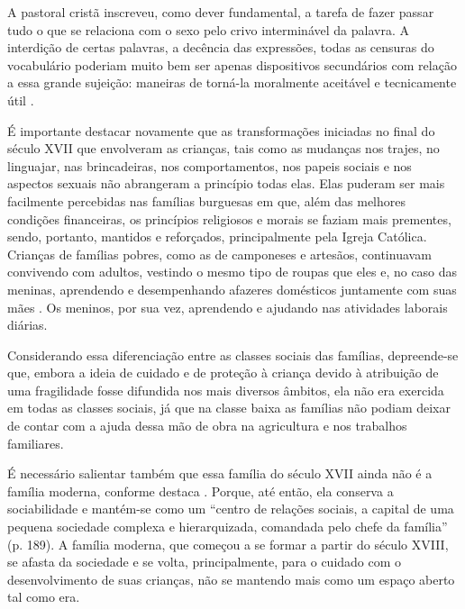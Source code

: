 \begin{citacao}
	A pastoral cristã inscreveu, como dever fundamental, a tarefa de fazer passar tudo o que se relaciona com o sexo pelo crivo interminável da palavra. A interdição de certas palavras, a decência das expressões, todas as censuras do vocabulário poderiam muito bem ser apenas dispositivos secundários com relação a essa grande sujeição: maneiras de torná-la moralmente aceitável e tecnicamente útil \cite[p. 24]{FOUCAULT1988}.
\end{citacao}

É importante destacar novamente que as transformações iniciadas no final do século XVII que envolveram as crianças, tais como as mudanças nos trajes, no linguajar, nas brincadeiras, nos comportamentos, nos papeis sociais e nos aspectos sexuais não abrangeram a princípio todas elas. Elas puderam ser mais facilmente percebidas nas famílias burguesas em que, além das melhores condições financeiras, os princípios religiosos e morais se faziam mais prementes, sendo, portanto, mantidos e reforçados, principalmente pela Igreja Católica. Crianças de famílias pobres, como as de camponeses e artesãos, continuavam convivendo com adultos, vestindo o mesmo tipo de roupas que eles e, no caso das meninas, aprendendo e desempenhando afazeres domésticos juntamente com suas mães \cite{ARIES2011}. Os meninos, por sua vez, aprendendo e ajudando nas atividades laborais diárias.

Considerando essa diferenciação entre as classes sociais das famílias, depreende-se que, embora a ideia de cuidado e de proteção à criança devido à atribuição de uma fragilidade fosse difundida nos mais diversos âmbitos, ela não era exercida em todas as classes sociais, já que na classe baixa as famílias não podiam deixar de contar com a ajuda dessa mão de obra na agricultura e nos trabalhos familiares\footnotemark.


É necessário salientar também que essa família do século XVII ainda não é a família moderna, conforme destaca . Porque, até então, ela conserva a sociabilidade e mantém-se como um ``centro de relações sociais, a capital de uma pequena sociedade complexa e hierarquizada, comandada pelo chefe da família'' (p. 189). A família moderna, que começou a se formar a partir do século XVIII, se afasta da sociedade e se volta, principalmente, para o cuidado com o desenvolvimento de suas crianças, não se mantendo mais como um espaço aberto tal como era.

